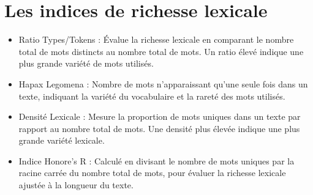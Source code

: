 \documentclass[12pt,a4paper,oneside,titlepage]{book} %
\begin{document}
	\section*{Les indices de richesse lexicale}
	\label{annexe_richesse_lex}
	\begin{itemize}
		
	\item Ratio Types/Tokens : Évalue la richesse lexicale en comparant le nombre total de mots distincts au nombre total de mots. Un ratio élevé indique une plus grande variété de mots utilisés.

\item Hapax Legomena : Nombre de mots n'apparaissant qu'une seule fois dans un texte, indiquant la variété du vocabulaire et la rareté des mots utilisés.

 \item Densité Lexicale : Mesure la proportion de mots uniques dans un texte par rapport au nombre total de mots. Une densité plus élevée indique une plus grande variété lexicale.

 \item Indice Honore's R : Calculé en divisant le nombre de mots uniques par la racine carrée du nombre total de mots, pour évaluer la richesse lexicale ajustée à la longueur du texte.
	\end{itemize}

			\pagebreak
			\nocite{*}
	\printbibliography
\end{document}
